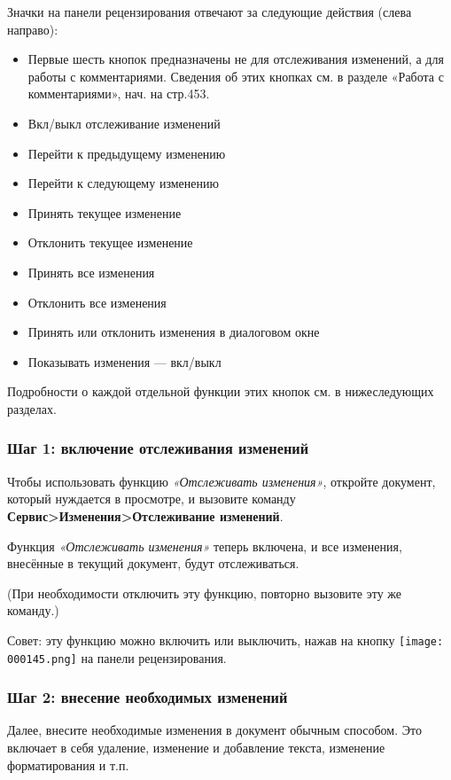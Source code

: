 ﻿\documentclass[a4paper,10pt]{article}
\begin{document}
Значки на панели рецензирования отвечают за следующие действия (слева направо):
\begin{itemize}
 \item Первые шесть кнопок предназначены не для отслеживания изменений, а для работы с комментариями. Сведения об этих кнопках см. в разделе «Работа с комментариями», нач. на стр.453.
 \newline
 \item Вкл/выкл отслеживание изменений
 \item Перейти к предыдущему изменению
 \item Перейти к следующему изменению
 \item Принять текущее изменение
 \item Отклонить текущее изменение
 \item Принять все изменения
 \item Отклонить все изменения
 \item Принять или отклонить изменения в диалоговом окне
 \item Показывать изменения — вкл/выкл
\end{itemize}

Подробности о каждой отдельной функции этих кнопок см. в нижеследующих разделах.

\subsubsection{Шаг 1: включение отслеживания изменений}
Чтобы использовать функцию \textit{«Отслеживать изменения»}, откройте документ, который нуждается в просмотре, и вызовите команду \textbf{Сервис>Изменения>Отслеживание изменений}.

Функция \textit{«Отслеживать изменения»} теперь включена, и все изменения, внесённые в текущий документ, будут отслеживаться.

(При необходимости отключить эту функцию, повторно вызовите эту же команду.)

Совет: эту функцию можно включить или выключить, нажав на кнопку \texttt{[image: 000145.png]} на панели рецензирования.

\subsubsection{Шаг 2: внесение необходимых изменений}
Далее, внесите необходимые изменения в документ обычным способом. Это включает в себя удаление, изменение и добавление текста, изменение форматирования и т.п.
\end{document}
